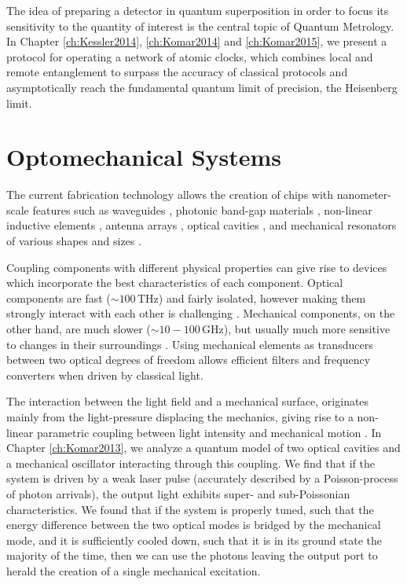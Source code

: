 The idea of preparing a detector in quantum
superposition in order to focus its sensitivity to the quantity of interest is
the central topic of Quantum Metrology. In Chapter \ref{ch:Kessler2014},
\ref{ch:Komar2014} and \ref{ch:Komar2015}, we present a
protocol for operating a network of atomic clocks, which combines local and
remote entanglement to surpass the accuracy of classical protocols and
asymptotically reach the fundamental quantum limit of precision, the Heisenberg limit. 


 
 
 
 
 
 
\section{Optomechanical Systems}
The current fabrication technology allows the creation of chips with
nanometer-scale features such as waveguides \cite{Mekis1996}, photonic band-gap
materials \cite{Foresi1997}, non-linear inductive elements \cite{Makhlin1999},
antenna arrays \cite{Yu2014}, optical cavities \cite{Painter2001}, and
mechanical resonators of various shapes and sizes \cite{Aspelmeyer2014}.

Coupling components with different physical properties can give rise to devices
which incorporate the best characteristics of each component.
Optical components are fast ($\sim 100\,\mathrm{THz}$) and fairly isolated,
however making them strongly interact with each other is challenging
\cite{Chang2007}.
Mechanical components, on the other hand, are much slower ($\sim
10-100\,\mathrm{GHz}$), but usually much more sensitive to changes in their
surroundings \cite{Aspelmeyer2014}. Using mechanical elements as transducers
between two optical degrees of freedom allows efficient filters and frequency
converters \cite{Eichenfield2009} when driven by classical light.

The interaction between the light field and a mechanical surface, originates
mainly from the light-pressure displacing the mechanics, giving rise to a
non-linear parametric coupling between light intensity and mechanical motion
\cite{Meystre2013}. In Chapter \ref{ch:Komar2013}, we analyze a quantum model of
two optical cavities and a mechanical oscillator interacting through this
coupling. We find that if the system is driven by a weak laser pulse (accurately
described by a Poisson-process of photon arrivals), the output light exhibits
super- and sub-Poissonian characteristics.
We found that if the system is properly tuned, such that the energy difference
between the two optical modes is bridged by the mechanical mode, and it is
sufficiently cooled down, such that it is in its ground state the majority of
the time, then we can use the photons leaving the output port to herald the
creation of a single mechanical excitation.

